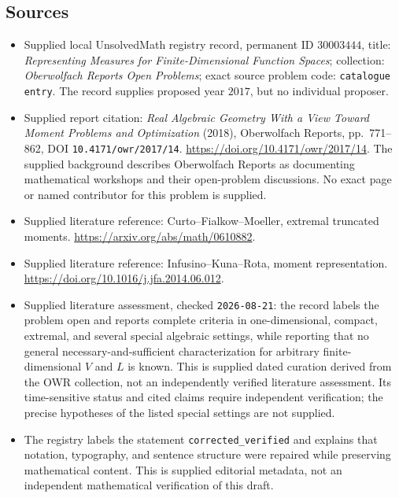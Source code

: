 \documentclass[11pt]{article}
\begin{document}
\subsection{Sources}
\begin{itemize}
\item Supplied local UnsolvedMath registry record, permanent ID \(30003444\), title: \emph{Representing Measures for Finite-Dimensional Function Spaces}; collection: \emph{Oberwolfach Reports Open Problems}; exact source problem code: \texttt{catalogue entry}. The record supplies proposed year \(2017\), but no individual proposer.
\item Supplied report citation: \emph{Real Algebraic Geometry With a View Toward Moment Problems and Optimization} (2018), Oberwolfach Reports, pp.~771--862, DOI \texttt{10.4171/owr/2017/14}. \url{https://doi.org/10.4171/owr/2017/14}. The supplied background describes Oberwolfach Reports as documenting mathematical workshops and their open-problem discussions. No exact page or named contributor for this problem is supplied.
\item Supplied literature reference: Curto--Fialkow--Moeller, extremal truncated moments. \url{https://arxiv.org/abs/math/0610882}.
\item Supplied literature reference: Infusino--Kuna--Rota, moment representation. \url{https://doi.org/10.1016/j.jfa.2014.06.012}.
\item Supplied literature assessment, checked \texttt{2026-08-21}: the record labels the problem open and reports complete criteria in one-dimensional, compact, extremal, and several special algebraic settings, while reporting that no general necessary-and-sufficient characterization for arbitrary finite-dimensional \(V\) and \(L\) is known. This is supplied dated curation derived from the OWR collection, not an independently verified literature assessment. Its time-sensitive status and cited claims require independent verification; the precise hypotheses of the listed special settings are not supplied.
\item The registry labels the statement \texttt{corrected\_verified} and explains that notation, typography, and sentence structure were repaired while preserving mathematical content. This is supplied editorial metadata, not an independent mathematical verification of this draft.
\end{itemize}
\end{document}
